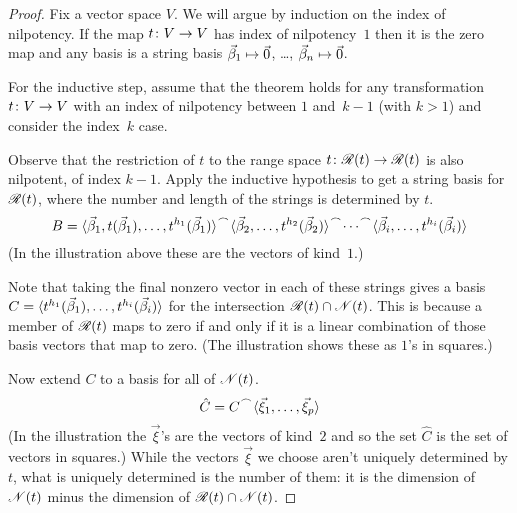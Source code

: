 \begin{proof}
Fix a vector space $V$. 
We will argue by induction on the index of nilpotency.
If the map $\mbox{$t\colon V\to V$}$
has index of nilpotency~\( 1 \) then it is the zero map and any basis 
is a string basis $\vec{\beta}_1\mapsto\vec{0}$, \ldots, 
$\vec{\beta}_n\mapsto\vec{0}$.

For the inductive step, assume that the theorem holds for any transformation
$\mbox{$t\colon V\to V$}$
with an index of nilpotency between $1$ and~\( k-1 \) (with $k>1$)
and consider the index~$k$ case.

Observe that the restriction of $t$ to
the range space
\( \mbox{$t\colon \mathscr{R}(t)\to \mathscr{R}(t)$} \) 
is also nilpotent, of index \( k-1 \).
Apply the inductive hypothesis to get a string basis for
\( \mathscr{R}(t) \),
where the number and length of the strings
is determined by \( t \).
\begin{equation*}
  B=\cat{\cat{\sequence{\vec{\beta}_1,t(\vec{\beta}_1),\dots,
     t^{h_1}(\vec{\beta}_1)}}{
  \cat{\sequence{\vec{\beta}_2,\ldots,t^{h_2}(\vec{\beta}_2)}}}{\cdots}}{
  \sequence{\vec{\beta}_i,\ldots,t^{h_i}(\vec{\beta}_i)} }
\end{equation*}
(In the illustration above these are the vectors of kind~\( 1 \).)

Note that taking the final nonzero vector in each 
of these strings
gives a basis
\( C=\langle t^{h_1}(\vec{\beta}_1),\dots,t^{h_i}(\vec{\beta}_i)\rangle \)
for the intersection \( \mathscr{R}(t)\cap\mathscr{N}(t) \).
This is because a member of \( \mathscr{R}(t) \) maps to zero if and only
if it is a linear combination of those basis vectors that map
to zero.
(The illustration shows these as \( 1 \)'s in squares.)

Now extend \( C \) to a basis for all of \( \mathscr{N}(t) \).
\begin{equation*}
  \hat{C}=\cat{C}{\sequence{\vec{\xi}_1,\dots,\vec{\xi}_p}}
\end{equation*}
(In the illustration the $\vec{\xi}$'s are the vectors of kind~\( 2 \) 
and so the set \( \hat{C} \) is the set of vectors in squares.)
While the vectors \( \vec{\xi} \) we choose aren't uniquely
determined by $t$, what is uniquely determined is the number
of them: it is the dimension of
\( \mathscr{N}(t) \) minus the dimension of
\( \mathscr{R}(t)\cap\mathscr{N}(t) \).


\end{proof}
